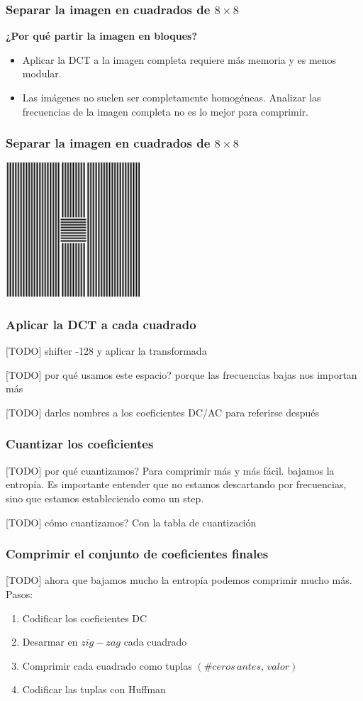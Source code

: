 \documentclass{beamer}
\begin{document}
\begin{frame}
    \frametitle{Separar la imagen en cuadrados de $8 \times 8$}
    \textbf{¿Por qué partir la imagen en bloques?}
    \begin{itemize}
        \item Aplicar la DCT a la imagen completa requiere más memoria y es menos modular. %
        \item Las imágenes no suelen ser completamente homogéneas. Analizar las frecuencias de la imagen completa no es lo mejor para comprimir.
    \end{itemize}
\end{frame}

\begin{frame}
    \frametitle{Separar la imagen en cuadrados de $8 \times 8$}
    \includegraphics[width=5cm, height=5cm]{fig/no_homogenea.png}
\end{frame}

\begin{frame}
    \frametitle{Aplicar la DCT a cada cuadrado}
    [TODO] shifter -128 y aplicar la transformada

    [TODO] por qué usamos este espacio? porque las frecuencias bajas nos importan más

    [TODO] darles nombres a los coeficientes DC/AC para referirse después
\end{frame}

\begin{frame}
    \frametitle{Cuantizar los coeficientes}
    [TODO] por qué cuantizamos? Para comprimir más y más fácil. bajamos la entropía.
    Es importante entender que no estamos descartando por frecuencias, sino
    que estamos estableciendo como un step.

    [TODO] cómo cuantizamos? Con la tabla de cuantización
\end{frame}

\begin{frame}
    \frametitle{Comprimir el conjunto de coeficientes finales}

    [TODO] ahora que bajamos mucho la entropía podemos comprimir mucho más. Pasos:
    \begin{enumerate}
        \item Codificar los coeficientes DC
        \item Desarmar en $zig-zag$ cada cuadrado
        \item Comprimir cada cuadrado como tuplas $(\# ceros \, antes, \, valor)$
        \item Codificar las tuplas con Huffman

    \end{enumerate}
\end{frame}
\end{document}
